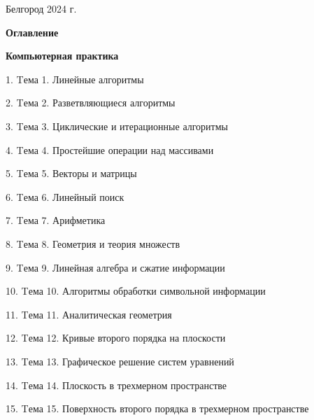 \documentclass[12pt, a4paper]{article}
\begin{document}
	\begin{center}
		\vspace{3cm}
		{\large Белгород 2024 г.}
	\end{center}
	




	\begin{center}
		\newpage
		{\Large \textbf{Оглавление}}
	\end{center}
	\begin{flushleft}
		{\large \textbf{Компьютерная практика}}
		
		{1. Tема 1. Линейные алгоритмы} \par
		{2. Tема 2. Разветвляющиеся алгоритмы} \par
		{3. Tема 3. Циклические и итерационные алгоритмы} \par
		{4. Tема 4. Простейшие операции над массивами} \par
		{5. Tема 5. Векторы и матрицы} \par
		{6. Tема 6. Линейный поиск} \par
		{7. Tема 7. Арифметика} \par
		{8. Tема 8. Геометрия и теория множеств} \par
		{9. Tема 9. Линейная алгебра и сжатие информации} \par
		{10. Tема 10. Алгоритмы обработки символьной информации} \par
		{11. Tема 11. Аналитическая геометрия} \par
		{12. Tема 12. Кривые второго порядка на плоскости} \par
		{13. Tема 13. Графическое решение систем уравнений} \par
		{14. Tема 14. Плоскость в трехмерном пространстве} \par
		{15. Tема 15. Поверхность второго порядка в трехмерном пространстве} \par
	\end{flushleft}
\end{document}
